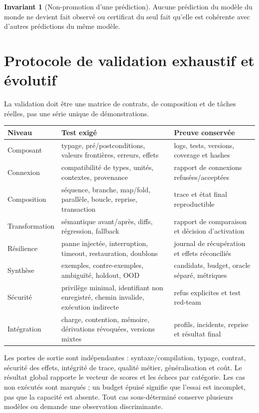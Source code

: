 \documentclass[11pt,a4paper]{article}
\newcommand{\code}[1]{\path{#1}}
\theoremstyle{definition}
\newtheorem{invariant}[definition]{Invariant}
\theoremstyle{plain}
\theoremstyle{remark}
\begin{document}
\begin{invariant}[Non-promotion d'une prédiction]
Aucune prédiction du modèle du monde ne devient fait observé ou certificat du seul fait qu'elle est cohérente avec d'autres prédictions du même modèle.
\end{invariant}

\section{Protocole de validation exhaustif et évolutif}
La validation doit être une matrice de contrats, de composition et de tâches réelles, pas une série unique de démonstrations.
\begin{longtable}{p{}p{}p{}}
\toprule Niveau & Test exigé & Preuve conservée \\
\midrule
Composant & typage, pré/postconditions, valeurs frontières, erreurs, effets & logs, tests, versions, coverage et hashes \\
Connexion & compatibilité de types, unités, contextes, provenance & rapport de connexions refusées/acceptées \\
Composition & séquence, branche, map/fold, parallèle, boucle, reprise, transaction & trace et état final reproductible \\
Transformation & sémantique avant/après, diffs, régression, fallback & rapport de comparaison et décision d'activation \\
Résilience & panne injectée, interruption, timeout, restauration, doublons & journal de récupération et effets réconciliés \\
Synthèse & exemples, contre-exemples, ambiguïté, holdout, OOD & candidats, budget, oracle séparé, métriques \\
Sécurité & privilège minimal, identifiant non enregistré, chemin invalide, exécution indirecte & refus explicites et test red-team \\
Intégration & charge, contention, mémoire, dérivations révoquées, versions mixtes & profils, incidents, reprise et résultat final \\
\bottomrule
\end{longtable}

Les portes de sortie sont indépendantes : syntaxe/compilation, typage, contrat, sécurité des effets, intégrité de trace, qualité métier, généralisation et coût. Le résultat global rapporte le vecteur de scores et les échecs par catégorie. Les cas non exécutés sont marqués \code{NOT_RUN}; un budget épuisé signifie que l'essai est incomplet, pas que la capacité est absente. Tout cas sous-déterminé conserve plusieurs modèles ou demande une observation discriminante.
\end{document}
